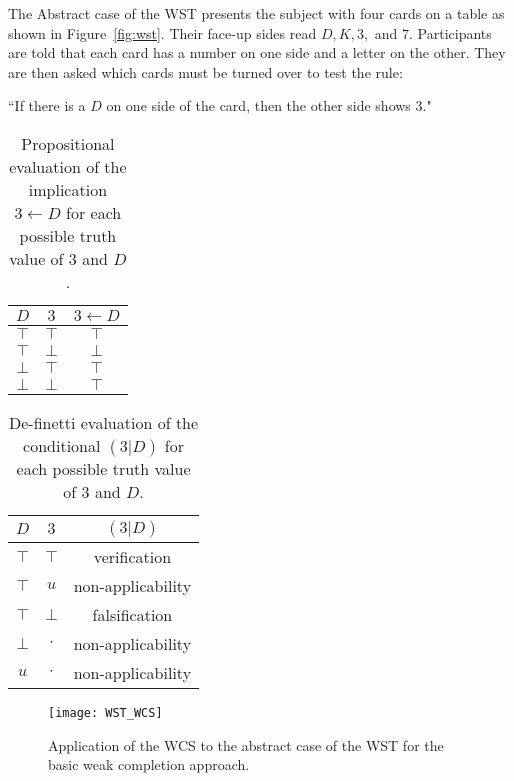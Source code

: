 The Abstract case of the WST presents the subject with four cards on a table as shown in Figure~\ref{fig:wst}. Their face-up sides read $D, K, 3,$ and $7$. Participants are told that each card has a number on one side and a letter on the other. They are then asked which cards must be turned over to test the rule:

\begin{center}
``If there is a $D$ on one side of the card, then the other side shows $3$."
\end{center} 

\begin{table}
\begin{center}


\begin{tabular}{ c c c}
  \textbf{$D$}&  \textbf{$3$}& \textbf{$3\leftarrow D$} \\ 
  \hline
 $\top$ & $\top$ & $\top$\\  
 $\top$ & $\bot$ & $\bot$\\  
 $\bot$ & $\top$ & $\top$\\
 $\bot$ & $\bot$ & $\top$
\end{tabular}
\caption{Propositional evaluation of the implication $3 \leftarrow D$ for each possible truth value of $3$ and $D$.}
\label{tbl:wst_impl}
\end{center}
\end{table}

\begin{table}
\begin{center}


\begin{tabular}{ c c c}
  \textbf{$D$}&  \textbf{$3$}& \textbf{$(3|D)$} \\ 
  \hline
 $\top$ & $\top$ & verification\\  
  $\top$ & $u$ & non-applicability\\ 
 $\top$ & $\bot$ & falsification\\  
 $\bot$ & $\cdot$ & non-applicability\\
 $u$ & $\cdot$ & non-applicability
\end{tabular}
\caption{De-finetti evaluation of the conditional $(3|D)$ for each possible truth value of $3$ and $D$.}
\label{tbl:wst_classical}
\end{center}
\end{table}

\begin{figure}
\centering \texttt{[image: WST\_WCS]}
\caption{Application of the WCS to the abstract case of the WST for the basic weak completion approach.}
\label{wst_wcs}
\end{figure}

